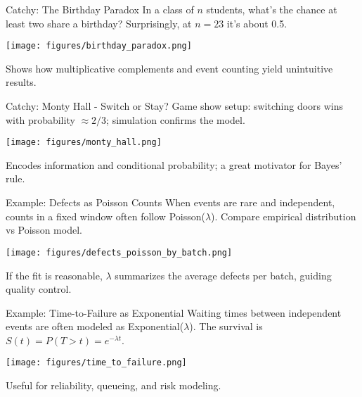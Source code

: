 \documentclass[aspectratio=43]{beamer}
\def\textemdash{-}%
\def\P{P}%
\def\mathbb#1{#1}%
\renewcommand{\P}{\mathbb{P}}
\newcommand{\1}{\mathbf{1}}
\begin{document}
\begin{frame}{Catchy: The Birthday Paradox}
  In a class of $n$ students, what's the chance at least two share a birthday? Surprisingly, at $n=23$ it's about 0.5.
  \begin{center}
    \texttt{[image: figures/birthday\_paradox.png]}
  \end{center}
  {\small Shows how multiplicative complements and event counting yield unintuitive results.}
\end{frame}

\begin{frame}{Catchy: Monty Hall \textemdash{} Switch or Stay?}
  Game show setup: switching doors wins with probability $\approx 2/3$; simulation confirms the model.
  \begin{center}
    \texttt{[image: figures/monty\_hall.png]}
  \end{center}
  {\small Encodes information and conditional probability; a great motivator for Bayes' rule.}
\end{frame}

\begin{frame}{Example: Defects as Poisson Counts}
  When events are rare and independent, counts in a fixed window often follow Poisson($\lambda$). Compare empirical distribution vs Poisson model.
  \begin{center}
  \texttt{[image: figures/defects\_poisson\_by\_batch.png]}
  \end{center}
  {\small If the fit is reasonable, $\lambda$ summarizes the average defects per batch, guiding quality control.}
\end{frame}

\begin{frame}{Example: Time-to-Failure as Exponential}
  Waiting times between independent events are often modeled as Exponential($\lambda$). The survival is $S(t)=\P(T>t)=e^{-\lambda t}$.
  \begin{center}
    \texttt{[image: figures/time\_to\_failure.png]}
  \end{center}
  {\small Useful for reliability, queueing, and risk modeling.}
\end{frame}
\end{document}
